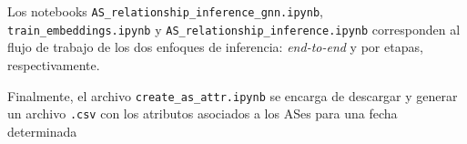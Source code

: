 Los notebooks \texttt{AS\allowbreak\_relationship\allowbreak\_inference\allowbreak\_gnn.ipynb}, \texttt{train\allowbreak\_embeddings.ipynb} y \texttt{AS\allowbreak\_relationship\allowbreak\_inference.ipynb} corresponden al flujo de trabajo de los dos enfoques de inferencia: \textit{end-to-end} y por etapas, respectivamente.

Finalmente, el archivo \texttt{create\_as\_attr.ipynb} se encarga de descargar y generar un archivo \texttt{.csv} con los atributos asociados a los ASes para una fecha determinada\\














